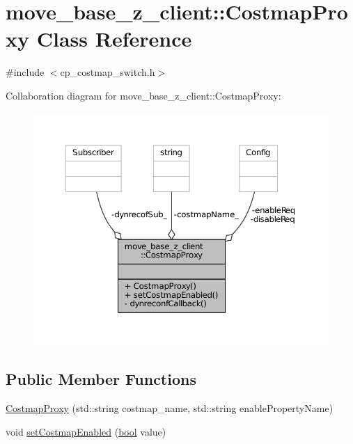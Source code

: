 \hypertarget{classmove__base__z__client_1_1CostmapProxy}{}\section{move\+\_\+base\+\_\+z\+\_\+client\+:\+:Costmap\+Proxy Class Reference}
\label{classmove__base__z__client_1_1CostmapProxy}


{\ttfamily \#include $<$cp\+\_\+costmap\+\_\+switch.\+h$>$}



Collaboration diagram for move\+\_\+base\+\_\+z\+\_\+client\+:\+:Costmap\+Proxy\+:
\nopagebreak
\begin{figure}[H]
\begin{center}
\leavevmode
\includegraphics[width=350pt]{classmove__base__z__client_1_1CostmapProxy__coll__graph}
\end{center}
\end{figure}
\subsection*{Public Member Functions}
\begin{DoxyCompactItemize}
\item 
\hyperlink{classmove__base__z__client_1_1CostmapProxy_aa23e6592d673c35459b6183120640649}{Costmap\+Proxy} (std\+::string costmap\+\_\+name, std\+::string enable\+Property\+Name)
\item 
void \hyperlink{classmove__base__z__client_1_1CostmapProxy_a7629d044447e215b5cdb1d15dedcbb35}{set\+Costmap\+Enabled} (\hyperlink{classbool}{bool} value)
\end{DoxyCompactItemize}
